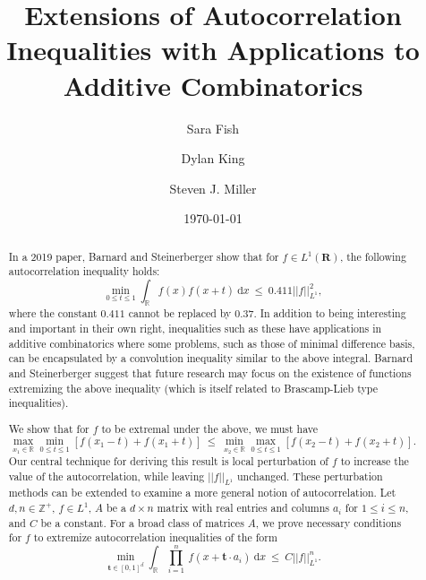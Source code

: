 \documentclass[11pt,reqno]{amsart}
\title{Extensions of Autocorrelation Inequalities with Applications to Additive Combinatorics}
\author{Sara Fish}
\author{Dylan King}
\author{Steven J. Miller}
\date{\today}
\numberwithin{equation}{section}
\theoremstyle{plain}
\newcommand{\R}{\ensuremath{\mathbb{R}}}
\begin{document}
\maketitle

\begin{abstract}
In a 2019 paper, Barnard and Steinerberger show that for $f\in L^1(\mathbf{R})$, the following autocorrelation inequality holds:
\begin{equation*}
    \min_{0 \leq t \leq 1} \int_\R f(x) f(x+t)\ \mathrm{d}x \ \leq\ 0.411 ||f||_{L^1}^2,
\end{equation*}
where the constant $0.411$ cannot be replaced by $0.37$. In addition to being interesting and important in their own right, inequalities such as these have applications in additive combinatorics where some problems, such as those of minimal difference basis, can be encapsulated by a convolution inequality similar to the above integral. Barnard and Steinerberger suggest that future research may focus on the existence of functions extremizing the above inequality (which is itself related to Brascamp-Lieb type inequalities).

We show that for $f$ to be extremal under the above, we must have
\begin{equation*}
    \max_{x_1 \in \R }\min_{0 \leq t \leq 1} \left[ f(x_1-t)+f(x_1+t) \right] \ \leq\ \min_{x_2 \in \R } \max_{0 \leq t \leq 1} \left[ f(x_2-t)+f(x_2+t) \right] .
\end{equation*}
Our central technique for deriving this result is local perturbation of $f$ to increase the value of the autocorrelation, while leaving $||f||_{L^1}$ unchanged. These perturbation methods can be extended to examine a more general notion of autocorrelation. Let $d,n \in \mathbb{Z}^+$, $f \in L^1$, $A$ be a $d \times n$ matrix with real entries and columns $a_i$ for $1 \leq i \leq n$, and $C$ be a constant. For a broad class of matrices $A$, we prove necessary conditions for $f$ to extremize autocorrelation inequalities of the form
\begin{equation*}
    \min_{ \mathbf{t} \in [0,1]^d } \int_{\R} \prod_{i=1}^n\ f(x+ \mathbf{t} \cdot a_i)\ \mathrm{d}x\ \leq\ C ||f||_{L^1}^n.
\end{equation*}
\end{abstract}
\end{document}
